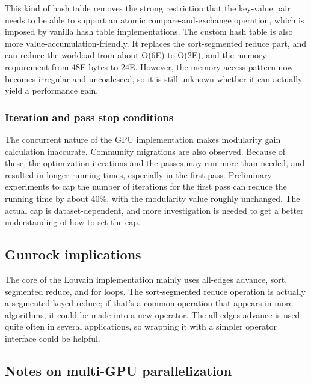 \documentclass[10pt,oneside]{memoir}
\begin{document}
This kind of hash table removes the strong restriction that the
key-value pair needs to be able to support an atomic
compare-and-exchange operation, which is imposed by vanilla hash table
implementations. The custom hash table is also more
value-accumulation-friendly. It replaces the sort-segmented reduce part,
and can reduce the workload from about O(6\textbar{}E\textbar{}) to
O(2\textbar{}E\textbar{}), and the memory requirement from
48\textbar{}E\textbar{} bytes to 24\textbar{}E\textbar{}. However, the
memory access pattern now becomes irregular and uncoalesced, so it is
still unknown whether it can actually yield a performance gain.

\hypertarget{iteration-and-pass-stop-conditions}{%
\subsubsection{Iteration and pass stop
conditions}\label{iteration-and-pass-stop-conditions}}

The concurrent nature of the GPU implementation makes modularity gain
calculation inaccurate. Community migrations are also observed. Because
of these, the optimization iterations and the passes may run more than
needed, and resulted in longer running times, especially in the first
pass. Preliminary experiments to cap the number of iterations for the
first pass can reduce the running time by about 40\%, with the
modularity value roughly unchanged. The actual cap is dataset-dependent,
and more investigation is needed to get a better understanding of how to
set the cap.

\hypertarget{gunrock-implications-3}{%
\subsection{Gunrock implications}\label{gunrock-implications-3}}

The core of the Louvain implementation mainly uses all-edges advance,
sort, segmented reduce, and for loops. The sort-segmented reduce
operation is actually a segmented keyed reduce; if that's a common
operation that appears in more algorithms, it could be made into a new
operator. The all-edges advance is used quite often in several
applications, so wrapping it with a simpler operator interface could be
helpful.

\hypertarget{notes-on-multi-gpu-parallelization-4}{%
\subsection{Notes on multi-GPU
parallelization}\label{notes-on-multi-gpu-parallelization-4}}
\end{document}

